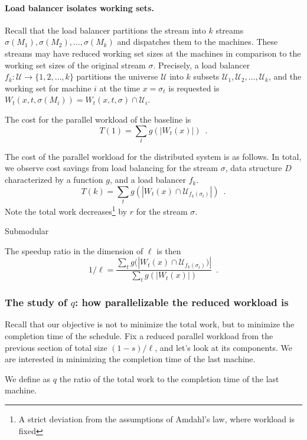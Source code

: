 \paragraph*{Load balancer isolates working sets.}
Recall that the load balancer partitions the stream into $k$ streams $\sigma(M_1), \sigma(M_2), \ldots, \sigma(M_k)$ and dispatches them to the machines.
These streams may have reduced working set sizes at the machines in comparison to the working set sizes of the original stream $\sigma$.
Precisely, a load balancer $f_k : \mathcal{U} \to \{1, 2, \ldots, k\}$ partitions the universe $\mathcal{U}$ into $k$ subsets $\mathcal{U}_1, \mathcal{U}_2, \ldots, \mathcal{U}_k$, and the working set for machine $i$ at the time $x = \sigma_t$ is requested is $W_t(x, t, \sigma(M_i)) = W_t(x, t, \sigma) \cap \mathcal{U}_i$.

The cost for the parallel workload of the baseline is 
\[
	T(1) = \sum_{t} g(|W_t(x)|)\enspace .
\]


The cost of the parallel workload for the distributed system is as follows.
In total, we observe cost savings from load balancing for the stream $\sigma$, data structure $D$ characterized by a function $g$, and a load balancer $f_k$.
\[
	T(k) = \sum_{t} g(|W_t(x) \cap \mathcal{U}_{f_k(\sigma_t)}|) \enspace .
\]
Note the total work decreases\footnote{A strict deviation from the assumptions of Amdahl's law, where workload is fixed} by $r$ for the stream $\sigma$.

\begin{observation}
	Submodular
\end{observation}

The speedup ratio in the dimension of $\ell$ is then 
\[
	1/\ell = \frac{\sum_{t} g(|W_t(x) \cap \mathcal{U}_{f_k(\sigma_t)})|}{\sum_{t} g(|W_t(x)|)}  \enspace .
\]


\subsubsection{The study of $q$: how parallelizable the reduced workload is}

Recall that our objective is not to minimize the total work, but to minimize the completion time of the schedule.
Fix a reduced parallel workload from the previous section of total size $(1-s)/\ell$, and let's look at its components.
We are interested in minimizing the completion time of the last machine. 

We define as $q$ the ratio of the total work to the completion time of the last machine.

